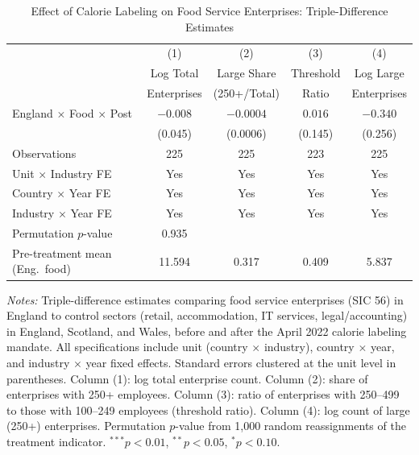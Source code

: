 \begin{table}[!t]
\centering
\caption{Effect of Calorie Labeling on Food Service Enterprises: Triple-Difference Estimates}
\label{tab:main_results}
\begin{tabular}{lcccc}
\hline\hline
 & (1) & (2) & (3) & (4) \\
 & Log Total & Large Share & Threshold & Log Large \\
 & Enterprises & (250+/Total) & Ratio & Enterprises \\
\hline
England $\times$ Food $\times$ Post & $-0.008$ & $-0.0004$ & $0.016$ & $-0.340$ \\
 & (0.045) & (0.0006) & (0.145) & (0.256) \\[6pt]
Observations & 225 & 225 & 223 & 225 \\
Unit $\times$ Industry FE & Yes & Yes & Yes & Yes \\
Country $\times$ Year FE & Yes & Yes & Yes & Yes \\
Industry $\times$ Year FE & Yes & Yes & Yes & Yes \\
Permutation $p$-value & 0.935 & & & \\
\hline
Pre-treatment mean (Eng.~food) & 11.594 & 0.317 & 0.409 & 5.837 \\
\hline\hline
\end{tabular}
\begin{tablenotes}[flushleft]
\small
\item \textit{Notes:} Triple-difference estimates comparing food service enterprises (SIC 56) 
in England to control sectors (retail, accommodation, IT services, legal/accounting) 
in England, Scotland, and Wales, before and after the April 2022 calorie labeling mandate. 
All specifications include unit (country $\times$ industry), country $\times$ year, 
and industry $\times$ year fixed effects. Standard errors clustered at the unit level 
in parentheses. Column (1): log total enterprise count. Column (2): share of enterprises 
with 250+ employees. Column (3): ratio of enterprises with 250--499 to those with 
100--249 employees (threshold ratio). Column (4): log count of large (250+) enterprises. 
Permutation $p$-value from 1,000 random reassignments of the treatment indicator. 
$^{***}p<0.01$, $^{**}p<0.05$, $^{*}p<0.10$.
\end{tablenotes}
\end{table}
